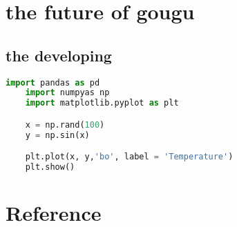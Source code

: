 \documentclass[a4paper]{article}
\begin{document}
\section{the future of gougu}
\subsection{the developing}

\begin{lstlisting}[language=Python]
    import pandas as pd 
    import numpyas np
    import matplotlib.pyplot as plt

    x = np.rand(100)
    y = np.sin(x)

    plt.plot(x, y,'bo', label = 'Temperature')
    plt.show()
\end{lstlisting}

\section{Reference}

\end{document}
